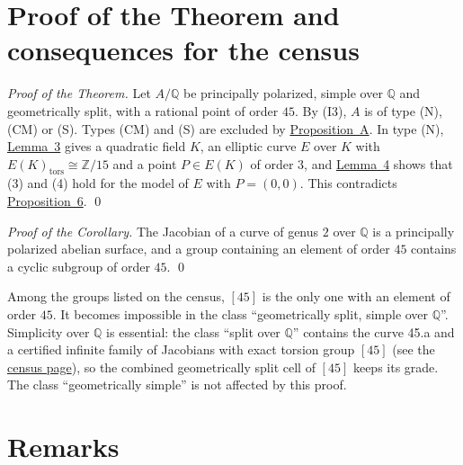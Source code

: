 \documentclass[11pt]{article}
\newcommand{\Q}{\mathbb Q}
\newcommand{\Z}{\mathbb Z}
\begin{document}
\section{Proof of the Theorem and consequences for the census}\label{census}

\emph{Proof of the Theorem.} Let \(A/\Q\) be principally polarized, simple over \(\Q\) and
geometrically split, with a rational point of order \(45\). By (I3), \(A\) is of type (N), (CM) or
(S). Types (CM) and (S) are excluded by \hyperref[prop-A]{Proposition~A}. In type (N),
\hyperref[lemma-parents]{Lemma~3} gives a quadratic field \(K\), an elliptic curve \(E\) over \(K\)
with \(E(K)_{\mathrm{tors}}\cong\Z/15\) and a point \(P\in E(K)\) of order \(3\), and
\hyperref[lemma-conditions]{Lemma~4} shows that (3) and (4) hold for the model of \(E\) with
\(P=(0,0)\). This contradicts \hyperref[prop-families]{Proposition~6}. \qed

\medskip
\emph{Proof of the Corollary.} The Jacobian of a curve of genus \(2\) over \(\Q\) is a principally
polarized abelian surface, and a group containing an element of order \(45\) contains a cyclic
subgroup of order \(45\). \qed

\medskip
Among the groups listed on the census, \([45]\) is the only one with an element of order \(45\). It
becomes impossible in the class ``geometrically split, simple over \(\Q\)''. Simplicity over \(\Q\)
is essential: the class ``split over \(\Q\)'' contains the curve 45.a and a certified infinite family
of Jacobians with exact torsion group \([45]\) (see the
\href{https://genus-2-torsion.github.io/group.html?g=45}{census page}), so the combined
geometrically split cell of \([45]\) keeps its grade. The class ``geometrically simple'' is not
affected by this proof.

\section{Remarks}\label{remarks}
\end{document}
